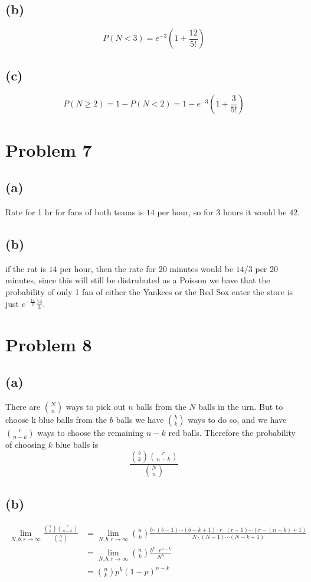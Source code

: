\subsection*{(b)}
$$P(N<3)=e^{-3}\left(1+\frac{12}{5!}\right)$$
\subsection*{(c)}
$$P(N\geq 2)=1-P(N<2)=\boxed{1-e^{-3}\left(1+\frac{3}{5!}\right)}$$
\section*{Problem 7}
\subsection*{(a)}
Rate for 1 hr for fans of both teams is $14$ per hour,
so for 3 hours it would be $\boxed{42}$.
\subsection*{(b)}
if the rat is $14$ per hour, then the rate for 
20 minutes would be $14/3$ per 20 minutes, since this will
still be distrubuted as a Poisson we have that the probability 
of only 1 fan of either the Yankees or the Red Sox enter the store
is just $\boxed{e^{-\frac{14}{3}}\frac{14}{3}}$.
\section*{Problem 8}
\subsection*{(a)}
There are $N\choose n$ ways to pick out $n$ balls from the $N$
balls in the urn. But to choose k blue balls from the $b$ balls
we have $b\choose k$ ways to do so, and we have 
$r\choose n-k$ ways to choose the remaining $n-k$ red balls. Therefore the 
probability of choosing $k$ blue balls is
$$\boxed{\frac{{b\choose k}{r \choose n-k}}{{N\choose n}}}$$
\subsection*{(b)}
\begin{align*}
    \lim_{N,b,r\to \infty}\frac{{b\choose k}{r \choose n-k}}{{N\choose n}}&=
        \lim_{N,b,r\to \infty}{n\choose k}\frac{b\cdot(b-1)\cdots (b-k+1)\cdot r\cdot (r-1)\cdots (r-(n-k)+1)}{N\cdot (N-1)\cdots (N-k+1)}\\
        &=\lim_{N,b,r\to \infty}{n\choose k}\frac{b^k\cdot r^{n-k}}{N^n}\\
        &={n\choose k}p^k(1-p)^{n-k}
\end{align*}


